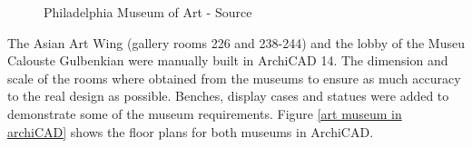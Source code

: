 \documentclass[12pt]{ucthesis}
\begin{document}
\begin{figure}[H]
 \centering
 \hspace{10 mm}
 \caption{Philadelphia Museum of Art - Source \cite{philadelphiamusem}}
\label{art-museums}
\end{figure}

The Asian Art Wing (gallery rooms 226 and 238-244) and the lobby of the Museu Calouste Gulbenkian were manually built in ArchiCAD 14. The dimension and scale of the rooms where obtained from the museums to ensure as much accuracy to the real design as possible. Benches, display cases and statues were added to demonstrate some of the museum requirements. Figure \ref{art museum in archiCAD} shows the floor plans for both museums in ArchiCAD.
\end{document}
